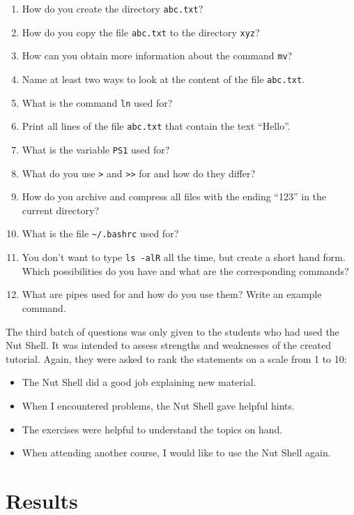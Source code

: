 \documentclass[paper=a4,twoside,abstract=on,cleardoublepage=empty,numbers=noenddot,toc=bib,toc=listof,12pt,appendixprefix=true]{scrreprt}
\begin{document}
\begin{enumerate}
    \item How do you create the directory \texttt{abc.txt}?
    \item How do you copy the file \texttt{abc.txt} to the directory \texttt{xyz}?
    \item How can you obtain more information about the command \texttt{mv}?
    \item Name at least two ways to look at the content of the file \texttt{abc.txt}.
    \item What is the command \texttt{ln} used for?
    \item Print all lines of the file \texttt{abc.txt} that contain the text “Hello”.
    \item What is the variable \texttt{PS1} used for?
    \item What do you use \texttt{>} and \texttt{>>} for and how do they differ?
    \item How do you archive and compress all files with the ending “123” in the current directory?
    \item What is the file \texttt{\textasciitilde/.bashrc} used for?
    \item You don't want to type \texttt{ls -alR} all the time, but create a short hand form. Which possibilities do you have and what are the corresponding commands?
    \item What are pipes used for and how do you use them? Write an example command.
\end{enumerate}

The third batch of questions was only given to the students who had used the Nut Shell. It was intended to assess strengths and weaknesses of the created tutorial. Again, they were asked to rank the statements on a scale from 1 to 10:

\begin{itemize}
    \item The Nut Shell did a good job explaining new material.
    \item When I encountered problems, the Nut Shell gave helpful hints.
    \item The exercises were helpful to understand the topics on hand.
    \item When attending another course, I would like to use the Nut Shell again.
\end{itemize}

\section{Results}
\end{document}
